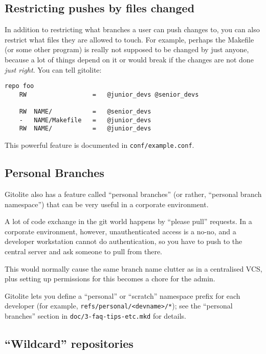 \documentclass[a4paper]{book}
\begin{document}
\subsection{Restricting pushes by files changed}

In addition to restricting what branches a user can push changes to, you can also restrict what files they are allowed to touch. For example, perhaps the Makefile (or some other program) is really not supposed to be changed by just anyone, because a lot of things depend on it or would break if the changes are not done \emph{just right}. You can tell gitolite:

\begin{shaded}\begin{verbatim}
repo foo
    RW                  =   @junior_devs @senior_devs

    RW  NAME/           =   @senior_devs
    -   NAME/Makefile   =   @junior_devs
    RW  NAME/           =   @junior_devs
\end{verbatim}\end{shaded}

This powerful feature is documented in \texttt{conf/example.conf}.

\subsection{Personal Branches}

Gitolite also has a feature called “personal branches” (or rather, “personal branch namespace”) that can be very useful in a corporate environment.

A lot of code exchange in the git world happens by “please pull” requests. In a corporate environment, however, unauthenticated access is a no-no, and a developer workstation cannot do authentication, so you have to push to the central server and ask someone to pull from there.

This would normally cause the same branch name clutter as in a centralised VCS, plus setting up permissions for this becomes a chore for the admin.

Gitolite lets you define a “personal” or “scratch” namespace prefix for each developer (for example, \texttt{refs/personal/\textless{}devname\textgreater{}/*}); see the “personal branches” section in \texttt{doc/3-faq-tips-etc.mkd} for details.

\subsection{“Wildcard” repositories}
\end{document}

